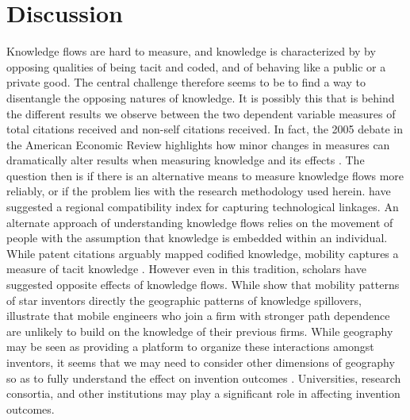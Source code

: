 \documentclass[12pt,letterpaper]{article}
\begin{document}
\section*{Discussion}
Knowledge flows are hard to measure, and knowledge is characterized by by opposing qualities of being tacit and coded, and of behaving like a public or a private good. The central challenge therefore seems to be to find a way to disentangle the opposing natures of knowledge. It is possibly this that is behind the different results we observe between the two dependent variable measures of total citations received and non-self citations received. In fact, the 2005 debate in the American Economic Review highlights how minor changes in measures can dramatically alter results when measuring knowledge and its effects \citep*{Henderson2005, Thompson2005}. The question then is if there is an alternative means to measure knowledge flows more reliably, or if the problem lies with the research methodology used herein. \cite{Maurseth2002} have suggested a regional compatibility index for capturing technological linkages. An alternate approach of understanding knowledge flows relies on the movement of people with the assumption that knowledge is embedded within an individual. While patent citations arguably mapped codified knowledge, mobility captures a measure of tacit knowledge \citep{Polanyi1958}. However even in this tradition, scholars have suggested opposite effects of knowledge flows. While \cite{Almeida1997} show that mobility patterns of star inventors directly the geographic patterns of knowledge spillovers, \cite{Song2003} illustrate that mobile engineers who join a firm with stronger path dependence are unlikely to build on the knowledge of their previous firms. While geography may be seen as providing a platform to organize these interactions amongst inventors, it seems that we may need to consider other dimensions of geography so as to fully understand the effect on invention outcomes \citep{Bunnell2001}. Universities, research consortia, and other institutions may play a significant role in affecting invention outcomes.
\end{document}
